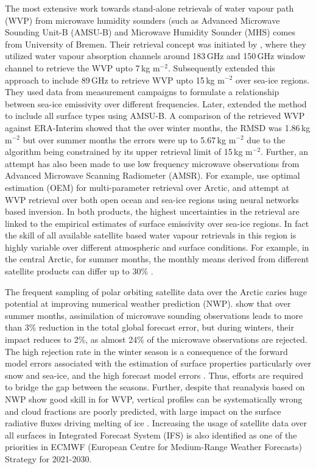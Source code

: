 \documentclass[12pt,oneside,a4paper]{article}
\begin{document}
The most extensive work towards stand-alone retrievals of water vapour path
(WVP) from microwave humidity sounders (such as Advanced Microwave Sounding
Unit-B (AMSU-B) and Microwave Humidity Sounder (MHS) comes from University of
Bremen. Their retrieval concept was initiated by \citet{miao:2001:atmos}, where
they utilized water vapour absorption channels around 183\,GHz and 150\,GHz
window channel to retrieve the WVP upto 7\,kg m$^{-2}$. Subsequently
\citet{melsheimer:2008:impro} extended this approach to include 89\,GHz to
retrieve WVP upto 15\,kg m$^{-2}$ over sea-ice regions. They used data from
measurement campaigns to formulate a relationship between sea-ice emissivity
over different frequencies. Later, \citet{scarlat:2018:retri} extended the
method to include all surface types using AMSU-B. A comparison of the retrieved
WVP against ERA-Interim showed that the over winter months, the RMSD was
1.86\,kg m$^{-2}$ but over summer months the errors were up to 5.67\,kg
m$^{-2}$ due to the algorithm being constrained by its upper retrieval limit of
15\,kg m$^{-2}$. Further, an attempt has also been made to use low
frequency microwave observations from Advanced Microwave Scanning Radiometer
(AMSR). For example, \citet{scarlat:2017:exper} use optimal estimation (OEM)
for multi-parameter retrieval over Arctic, and \citet{zabolotskikh:2020:anadv}
attempt at WVP retrieval over both open ocean and sea-ice regions using neural
networks based inversion. In both products, the highest uncertainties in the
retrieval are linked to the empirical estimates of surface emissivity over
sea-ice regions. In fact the skill of all available satellite based water
vapour retrievals in this region is highly variable over different atmospheric
and surface conditions. For example, in the central Arctic, for summer months,
the monthly means derived from different satellite products can differ up to
30\% \citep{crewell:2021:asyst}.

The frequent sampling of polar orbiting satellite data over the Arctic caries
huge potential at improving numerical weather prediction (NWP).
\citet{lawrence:2019:usean} show that over summer months, assimilation of
microwave sounding observations leads to more than 3\% reduction in the total
global forecast error, but during winters, their impact reduces to 2\%, as
almost 24\% of the microwave observations are rejected. The high rejection rate
in the winter season is a consequence of the forward model errors associated
with the estimation of surface properties particularly over snow and sea-ice,
and the high forecast model errors \citep{bauer:2016:aspec}. Thus, efforts are
required to bridge the gap between the seasons. Further, despite that
reanalysis based on NWP show good skill in for WVP, vertical profiles can be
systematically wrong and cloud fractions are poorly predicted, with large
impact on the surface radiative fluxes driving melting of ice
\citep{graham:2019:evalu}. Increasing the usage of satellite data over all
surfaces in Integrated Forecast System (IFS) is also identified as one of the
priorities in ECMWF (European Centre for Medium-Range Weather Forecasts)
Strategy for 2021-2030.
\end{document}
